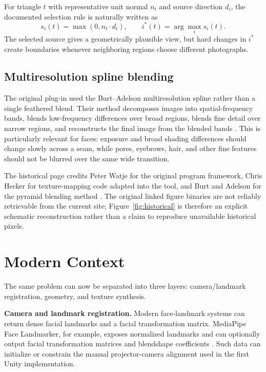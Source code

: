 \documentclass[10pt]{article}
\begin{document}
For triangle $t$ with representative unit normal $n_t$ and source direction $d_i$, the documented selection rule is naturally written as
\begin{equation}
    s_i(t)=\max(0,n_t\cdot d_i), \qquad i^*(t)=\arg\max_i s_i(t).
    \label{eq:historical_selection}
\end{equation}
The selected source gives a geometrically plausible view, but hard changes in $i^*$ create boundaries whenever neighboring regions choose different photographs.

\subsection{Multiresolution spline blending}
The original plug-in used the Burt--Adelson multiresolution spline rather than a single feathered blend. Their method decomposes images into spatial-frequency bands, blends low-frequency differences over broad regions, blends fine detail over narrow regions, and reconstructs the final image from the blended bands \cite{burt_adelson_1983}. This is particularly relevant for faces: exposure and broad shading differences should change slowly across a seam, while pores, eyebrows, hair, and other fine features should not be blurred over the same wide transition.

The historical page credits Peter Watje for the original program framework, Chris Hecker for texture-mapping code adapted into the tool, and Burt and Adelson for the pyramid blending method \cite{hurley_fullhead_web}. The original linked figure binaries are not reliably retrievable from the current site; Figure~\ref{fig:historical} is therefore an explicit schematic reconstruction rather than a claim to reproduce unavailable historical pixels.

\section{Modern Context}
The same problem can now be separated into three layers: camera/landmark registration, geometry, and texture synthesis.

\textbf{Camera and landmark registration.} Modern face-landmark systems can return dense facial landmarks and a facial transformation matrix. MediaPipe Face Landmarker, for example, exposes normalized landmarks and can optionally output facial transformation matrices and blendshape coefficients \cite{mediapipe_face_2026}. Such data can initialize or constrain the manual projector-camera alignment used in the first Unity implementation.
\end{document}
